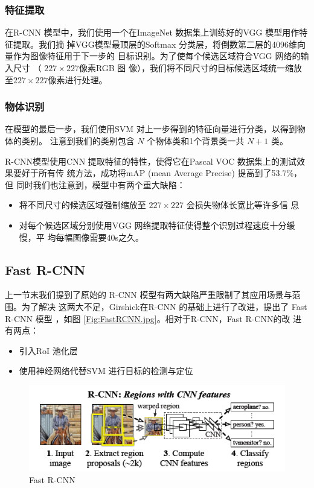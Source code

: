 \subsubsection{特征提取}

在R-CNN 模型中，我们使用一个在ImageNet 数据集上训练好的VGG 模型用作特征提取。我们摘
掉VGG模型最顶层的Softmax 分类层，将倒数第二层的4096维向量作为图像特征用于下一步的
目标识别。为了使每个候选区域符合VGG 网络的输入尺寸 （ $227 \times 227$像素RGB 图
像），我们将不同尺寸的目标候选区域统一缩放至$227 \times 227$像素进行处理。

\subsubsection{物体识别}

在模型的最后一步，我们使用SVM 对上一步得到的特征向量进行分类，以得到物体的类别。
注意到我们的类别包含 $N$ 个物体类和1个背景类一共 $N+1$ 类。

R-CNN模型使用CNN 提取特征的特性，使得它在Pascal VOC 数据集上的测试效果要好于所有传
统方法，成功将mAP (mean Average Precise) 提高到了53.7\%\cite{Girshick:2014jx}，但
同时我们也注意到，模型中有两个重大缺陷：

\begin{itemize}
  \item 将不同尺寸的候选区域强制缩放至 $227 \times 227$ 会损失物体长宽比等许多信
    息
  \item 对每个候选区域分别使用VGG 网络提取特征使得整个识别过程速度十分缓慢，平
     均每幅图像需要40s之久\cite{Girshick:2014jx}。
\end{itemize}

\subsection{Fast R-CNN}

上一节末我们提到了原始的 R-CNN 模型有两大缺陷严重限制了其应用场景与范围。为了解决
这两大不足，Girshick在R-CNN 的基础上进行了改进，提出了 Fast R-CNN 模型
\cite{Girshick:2015ib}，如图 \ref{Fig:FastRCNN.jpg}。相对于R-CNN，Fast R-CNN的改
进有两点：

\begin{itemize}
  \item 引入RoI 池化层
  \item 使用神经网络代替SVM 进行目标的检测与定位
\end{itemize}

\begin{figure}
  \centering
  \includegraphics[width=0.8\linewidth]{./Figure/FastRCNN.png}
  \caption{Fast R-CNN\cite{Girshick:2015ib}}\label{Fig:FastRCNN}
\end{figure}

